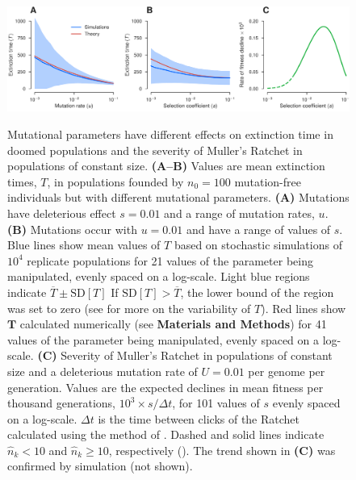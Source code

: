 \documentclass[9pt,lineno]{elife}
\begin{document}
\begin{figure}[ht!]
\includegraphics[width=\linewidth]{valid.pdf}
\caption{
Mutational parameters have different effects on extinction time in doomed populations and the severity of Muller's Ratchet in populations of constant size.
%
\textbf{(A--B)} Values are mean extinction times, $T$, in populations founded by $n_0=100$ mutation-free individuals but with different mutational parameters.
%
\textbf{(A)} Mutations have deleterious effect $s=0.01$ and a range of mutation rates, $u$.
%
\textbf{(B)} Mutations occur with $u=0.01$ and have a range of values of $s$.
%
Blue lines show mean values of $T$ based on stochastic simulations of $10^4$ replicate populations for 21 values of the parameter being manipulated, evenly spaced on a log-scale.
%
Light blue regions indicate $\overline{T} \pm  \mathrm{SD}[T]$  If $\mathrm{SD}[T] > \overline{T}$, the lower bound of the region was set to zero (see  for more on the variability of $T$).
%
Red lines show $\mathbf{T}$ calculated numerically (see \textbf{Materials and Methods}) for 41 values of the parameter being manipulated, evenly spaced on a log-scale.
%
\textbf{(C)} Severity of Muller's Ratchet in populations of constant size and a deleterious mutation rate of $U = 0.01$ per genome per generation.  Values are the expected declines in mean fitness per thousand generations, $10^3 \times s/\Delta t$, for 101 values of $s$ evenly spaced on a log-scale.  
$\Delta t$ is the time between clicks of the Ratchet calculated using the method of \citet{Gordo_On_2000, gor00b}.
Dashed and solid lines indicate $\hat n_k < 10$ and $\hat n_k \geq 10$, respectively ().  
%
The trend shown in \textbf{(C)} was confirmed by simulation (not shown).
}
\label{fig:valid}
\label{figsupp:sf2}
\end{figure}
\end{document}
